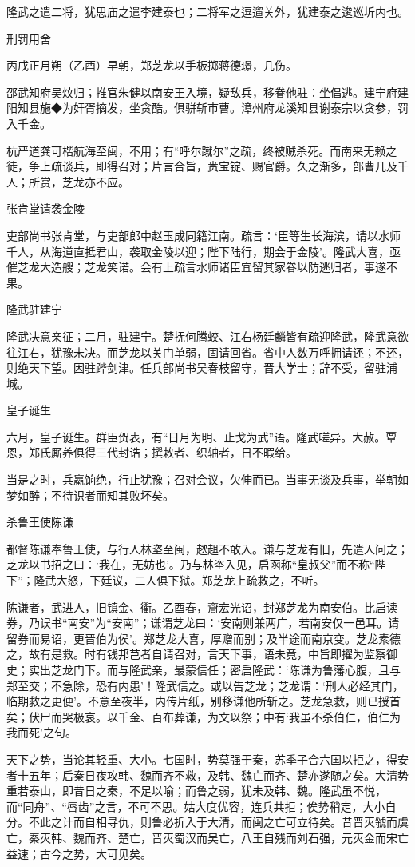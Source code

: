 \documentclass[]{article}
\begin{document}
隆武之遣二将，犹思庙之遣李建泰也；二将军之逗遛关外，犹建泰之逡巡圻内也。

刑罚用舍

丙戌正月朔（乙酉）早朝，郑芝龙以手板掷蒋德璟，几伤。

邵武知府吴炆归；推官朱健以南安王入境，疑敌兵，移眷他驻：坐倡逃。建宁府建阳知县施◆为奸胥摘发，坐贪酷。俱骈斩市曹。漳州府龙溪知县谢泰宗以贪参，罚入千金。

杭严道龚可楷航海至闽，不用；有``呼尔蹴尔''之疏，终被贼杀死。而南来无赖之徒，争上疏谈兵，即得召对；片言合旨，赉宝锭、赐官爵。久之渐多，部曹几及千人；所赏，芝龙亦不应。

张肯堂请袭金陵

吏部尚书张肯堂，与吏部郎中赵玉成同籍江南。疏言：`臣等生长海滨，请以水师千人，从海道直抵君山，袭取金陵以迎；陛下陆行，期会于金陵'。隆武大喜，亟催芝龙大造艘；芝龙笑诺。会有上疏言水师诸臣宜留其家眷以防逃归者，事遂不果。

隆武驻建宁

隆武决意亲征；二月，驻建宁。楚抚何腾蛟、江右杨廷麟皆有疏迎隆武，隆武意欲往江右，犹豫未决。而芝龙以关门单弱，固请回省。省中人数万呼拥请还；不还，则绝天下望。因驻跸剑津。任兵部尚书吴春枝留守，晋大学士；辞不受，留驻浦城。

皇子诞生

六月，皇子诞生。群臣贺表，有``日月为明、止戈为武''语。隆武嗟异。大赦。覃恩，郑氏厮养俱得三代封诰；撰敕者、织轴者，日不暇给。

当是之时，兵羸饷绝，行止犹豫；召对会议，欠伸而已。当事无谈及兵事，举朝如梦如醉；不待识者而知其败坏矣。

杀鲁王使陈谦

都督陈谦奉鲁王使，与行人林垐至闽，趑趄不敢入。谦与芝龙有旧，先遣人问之；芝龙以书招之曰：`我在，无妨也'。乃与林垐入见，启函称``皇叔父''而不称``陛下''；隆武大怒，下廷议，二人俱下狱。郑芝龙上疏救之，不听。

陈谦者，武进人，旧镇金、衢。乙酉春，齎宏光诏，封郑芝龙为南安伯。比启读券，乃误书``南安''为``安南''；谦谓芝龙曰：`安南则兼两广，若南安仅一邑耳。请留券而易诏，更晋伯为侯'。郑芝龙大喜，厚赠而别；及半途而南京变。芝龙素德之，故有是救。时有钱邦芑者自请召对，言天下事，语未竟，中旨即擢为监察御史；实出芝龙门下。而与隆武亲，最蒙信任；密启隆武：`陈谦为鲁藩心腹，且与郑至交；不急除，恐有内患'！隆武信之。或以告芝龙；芝龙谓：`刑人必经其门，临期救之更便'。不意至夜半，内传片纸，别移谦他所斩之。芝龙急救，则已授首矣；伏尸而哭极哀。以千金、百布葬谦，为文以祭；中有`我虽不杀伯仁，伯仁为我而死'之句。

天下之势，当论其轻重、大小。七国时，势莫强于秦，苏季子合六国以拒之，得安者十五年；后秦日夜攻韩、魏而齐不救，及韩、魏亡而齐、楚亦遂随之矣。大清势重若泰山，即昔日之秦，不足以喻；而鲁之弱，犹未及韩、魏。隆武虽不悦，而``同舟''、``唇齿''之言，不可不思。姑大度优容，连兵共拒；俟势稍定，大小自分。不此之计而自相寻仇，则鲁必折入于大清，而闽之亡可立待矣。昔晋灭虢而虞亡，秦灭韩、魏而齐、楚亡，晋灭蜀汉而吴亡，八王自残而刘石强，元灭金而宋亡益速；古今之势，大可见矣。
\end{document}
